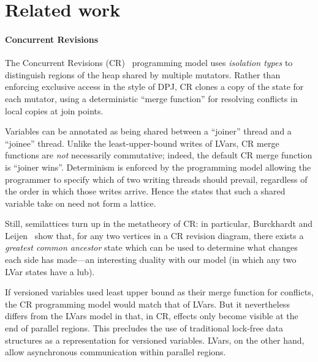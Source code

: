 \documentclass{article}
\begin{document}
\section{Related work}

\paragraph{Concurrent Revisions}

The Concurrent Revisions (CR)~\cite{concurrent-revisions-haskell11}
programming model uses \emph{isolation types} \cite{isolation-types}
to distinguish regions of the heap shared by multiple mutators.
Rather than enforcing exclusive access in the style of DPJ, CR clones
a copy of the state for each mutator, using a deterministic ``merge
function'' for resolving conflicts in local copies at join points.

Variables can be annotated as being shared between a ``joiner'' thread
and a ``joinee'' thread.  Unlike the least-upper-bound writes of
LVars, CR merge functions are \emph{not} necessarily commutative;
indeed, the default CR merge function is ``joiner wins''.  Determinism
is enforced by the programming model allowing the programmer to
specify which of two writing threads should prevail, regardless of the
order in which those writes arrive.  Hence the states that such a
shared variable take on need not form a lattice.

Still, semilattices turn up in the metatheory of CR: in particular,
Burckhardt and Leijen~\cite{semantics-concurrent-revisions} show that,
for any two vertices in a CR revision diagram, there exists a
\emph{greatest common ancestor} state which can be used to determine
what changes each side has made---an interesting duality with our
model (in which any two LVar states have a lub). 

If versioned variables used least upper bound as their merge function
for conflicts, the CR programming model would match that of LVars.    But it nevertheless
differs from the LVars model in that, in CR, effects only become
visible at the end of parallel regions. 
This precludes the use of traditional lock-free data structures as a
representation for versioned variables.  LVars, on the other hand,
allow asynchronous communication within parallel regions.
\end{document}
